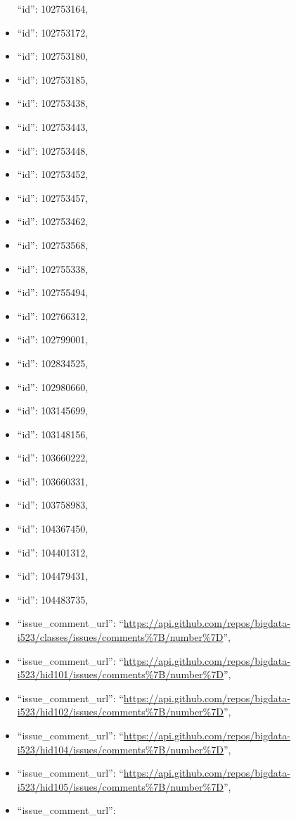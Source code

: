 \begin{itemize}
  ``id'': 102753164,
\item
  ``id'': 102753172,
\item
  ``id'': 102753180,
\item
  ``id'': 102753185,
\item
  ``id'': 102753438,
\item
  ``id'': 102753443,
\item
  ``id'': 102753448,
\item
  ``id'': 102753452,
\item
  ``id'': 102753457,
\item
  ``id'': 102753462,
\item
  ``id'': 102753568,
\item
  ``id'': 102755338,
\item
  ``id'': 102755494,
\item
  ``id'': 102766312,
\item
  ``id'': 102799001,
\item
  ``id'': 102834525,
\item
  ``id'': 102980660,
\item
  ``id'': 103145699,
\item
  ``id'': 103148156,
\item
  ``id'': 103660222,
\item
  ``id'': 103660331,
\item
  ``id'': 103758983,
\item
  ``id'': 104367450,
\item
  ``id'': 104401312,
\item
  ``id'': 104479431,
\item
  ``id'': 104483735,
\item
  ``issue\_comment\_url'':
  ``\url{https://api.github.com/repos/bigdata-i523/classes/issues/comments\%7B/number\%7D}'',
\item
  ``issue\_comment\_url'':
  ``\url{https://api.github.com/repos/bigdata-i523/hid101/issues/comments\%7B/number\%7D}'',
\item
  ``issue\_comment\_url'':
  ``\url{https://api.github.com/repos/bigdata-i523/hid102/issues/comments\%7B/number\%7D}'',
\item
  ``issue\_comment\_url'':
  ``\url{https://api.github.com/repos/bigdata-i523/hid104/issues/comments\%7B/number\%7D}'',
\item
  ``issue\_comment\_url'':
  ``\url{https://api.github.com/repos/bigdata-i523/hid105/issues/comments\%7B/number\%7D}'',
\item
  ``issue\_comment\_url'':

\end{itemize}
